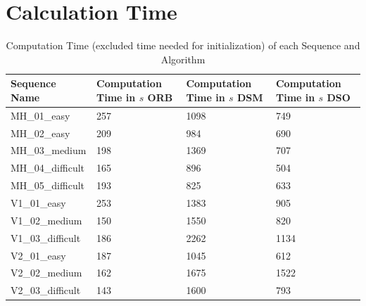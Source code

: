 	
	
	

\section{Calculation Time}

	\begin{table}
	\caption{Computation Time (excluded time needed for initialization) of each Sequence and Algorithm}
	\begin{tabular}{ |p{3cm}||p{3cm}|p{3cm}|p{3cm}|  }
	\hline
	Sequence Name& Computation Time in $s$ ORB & Computation Time in $s$ DSM & Computation Time in $s$ DSO \\
	\hline
	MH\_01\_easy & 257 & 1098 & 749\\
	MH\_02\_easy & 209 & 984 & 690\\
	MH\_03\_medium & 198 & 1369 & 707\\
	MH\_04\_difficult & 165 & 896 & 504\\
	MH\_05\_difficult & 193 & 825 & 633\\
	V1\_01\_easy & 253 & 1383 & 905\\
	V1\_02\_medium & 150 & 1550 & 820\\
	V1\_03\_difficult & 186 & 2262 & 1134\\
	V2\_01\_easy & 187 & 1045 & 612\\
	V2\_02\_medium & 162 & 1675 & 1522\\
	V2\_03\_difficult & 143 & 1600 & 793\\
	\hline
	\end{tabular}
	\label{table:comp_time}
	\end{table}


